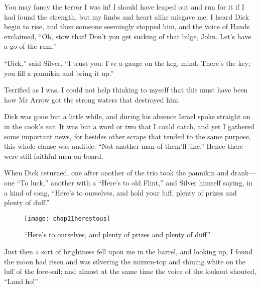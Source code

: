 You may fancy the terror I was in! I should have leaped out and run for it if I had found the strength, but my limbs and heart alike misgave me. I heard Dick begin to rise, and then someone seemingly stopped him, and the voice of Hands exclaimed, \enquote{Oh, stow that! Don’t you get sucking of that bilge, John. Let’s have a go of the rum.}

\enquote{Dick,} said Silver, \enquote{I trust you. I’ve a gauge on the keg, mind. There’s the key; you fill a pannikin and bring it up.}

Terrified as I was, I could not help thinking to myself that this must have been how Mr Arrow got the strong waters that destroyed him.

Dick was gone but a little while, and during his absence Israel spoke straight on in the cook’s ear. It was but a word or two that I could catch, and yet I gathered some important news, for besides other scraps that tended to the same purpose, this whole clause was audible: \enquote{Not another man of them’ll jine.} Hence there were still faithful men on board.

When Dick returned, one after another of the trio took the pannikin and drank---one \enquote{To luck,} another with a \enquote{Here’s to old Flint,} and Silver himself saying, in a kind of song, \enquote{Here’s to ourselves, and hold your luff, plenty of prizes and plenty of duff.}

 \begin{figure}[p]
\centering
\texttt{[image: chap11herestous]}
\caption[\enquote{Here’s to ourselves}]{\enquote{Here’s to ourselves, and plenty of prizes and plenty of duff}}
\end{figure}

Just then a sort of brightness fell upon me in the barrel, and looking up, I found the moon had risen and was silvering the mizzen-top and shining white on the luff of the fore-sail; and almost at the same time the voice of the lookout shouted, \enquote{Land ho!}
